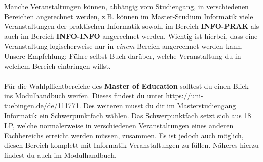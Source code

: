 \fi

\ifinfo
Manche Veranstaltungen können, abhängig vom Studiengang, in verschiedenen Bereichen angerechnet werden, z.B. können im Master-Studium Informatik viele Veranstaltungen der praktischen Informatik sowohl im Bereich \textbf{INFO-PRAK} als auch im Bereich \textbf{INFO-INFO} angerechnet werden. Wichtig ist hierbei, dass eine Veranstaltung logischerweise nur in \emph{einem} Bereich angerechnet werden kann. Unsere Empfehlung: Führe selbst Buch darüber, welche Veranstaltung du in welchem Bereich einbringen willst. \\\\
\iflehramt
Für die Wahlpflichtbereiche des \textbf{Master of Education} solltest du einen Blick ins Modulhandbuch werfen. Dieses findest du unter \url{https://uni-tuebingen.de/de/111771}.
\else
{}
Des weiteren musst du dir im Masterstudiengang Informatik ein Schwerpunktfach wählen. Das Schwerpunktfach setzt sich aus 18 LP, welche normalerweise in verschiedenen Veranstaltungen eines anderen Fachbereichs erreicht werden müssen, zusammen. Es ist jedoch auch möglich, diesen Bereich komplett mit Informatik-Veranstaltungen zu füllen. Näheres hierzu findest du auch im Modulhandbuch. 
\fi
\fi\

